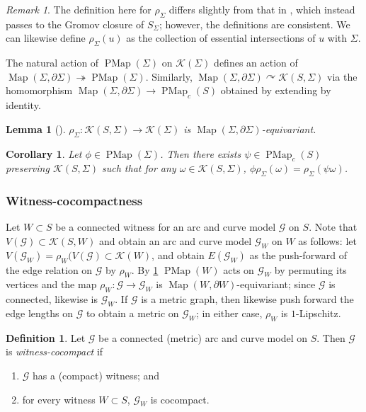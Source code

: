 \documentclass[twoside]{amsart}
\theoremstyle{plain}
\newtheorem{lemma}[theorem]{Lemma}
\newtheorem{corollary}[theorem]{Corollary}
\theoremstyle{break}
\theoremstyle{definition}
\newtheorem{definition}[theorem]{Definition}
\theoremstyle{remark}
\newtheorem{remark*}[theorem]{Remark}
\DeclareMathOperator{\Map}{Map}
\newcommand{\G}{\mathcal G}
\DeclareMathOperator{\PMap}{PMap}
\begin{document}
\begin{remark*}
  The definition here for $\rho_\Sigma$ differs slightly from that
  in \cite{ga_asdim}, which instead passes to the Gromov closure of
  $S_\Sigma$; however, the definitions are consistent.  We can
  likewise define $\rho_\Sigma(u)$ as the collection of essential
  intersections of $u$ with $\Sigma$.
\end{remark*}

The natural action of $\PMap(\Sigma)$ on $\mathcal{K}(\Sigma)$
defines an action of %
$\Map(\Sigma,\partial \Sigma)
\twoheadrightarrow \PMap(\Sigma)$.  Similarly, 
$\Map(\Sigma,\partial \Sigma) \curvearrowright
\mathcal{K}(S,\Sigma)$ via the homomorphism
$\Map(\Sigma,\partial \Sigma) \to \PMap_c(S)$ obtained by
extending by identity.

\begin{lemma}[{\cite[Lem.~4.14]{ga_asdim}}]\label{lem:projequi}
 $\rho_\Sigma: \mathcal{K}(S,\Sigma) \to \mathcal{K}(\Sigma)$
is $\Map(\Sigma,\partial \Sigma)$-equivariant.  
\end{lemma}

\begin{corollary}\label{cor:pbact}
  Let $\phi \in \PMap(\Sigma)$.  Then there exists $\psi
  \in \PMap_c(S)$ preserving $\mathcal{K}(S,\Sigma)$ 
  such that for any $\omega \in
  \mathcal{K}(S,\Sigma)$, $\phi\rho_\Sigma(\omega) =
  \rho_\Sigma(\psi \omega)$. 
\end{corollary}

\subsubsection{Witness-cocompactness}\label{sec:witness_gm}  Let $W
\subset S$ be a connected witness for an arc and curve
model $\G$ on $S$.  Note that $V(\G) \subset
\mathcal{K}(S, W)$ and obtain an arc and curve model $\G_W$ on $W$ as
follows: let $V(\G_W) = \rho_W(V(\G) \subset \mathcal{K}(W)$, and
obtain $E(\G_W)$ as the push-forward of the edge relation  on $\G$ by
$\rho_W$.  By \cref{cor:pbact} $\PMap(W)$ acts on $\G_W$ by
permuting its vertices and the map $\rho_W : \G \to \G_W$ is
$\Map(W,\partial W)$-equivariant; since $\G$ is connected, likewise
is $\G_W$. If $\G$ is a metric graph, then likewise push
forward the edge lengths on $\G$ to obtain a metric on $\G_W$; in
either case, $\rho_W$ is $1$-Lipschitz. 

\begin{definition}\label{def:witnessccpt}
  Let $\G$ be a connected (metric) arc and curve model on $S$.  Then $\G$ is
  \textit{witness-cocompact} if
  \begin{enumerate}
    \item $\G$ has a (compact) witness; and
    \item for every witness $W \subset S$, $\G_W$ is cocompact.
  \end{enumerate}
\end{definition}
\end{document}
